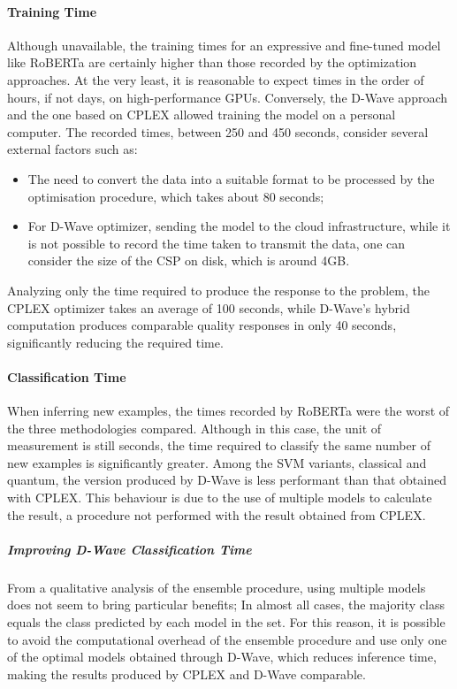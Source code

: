 \paragraph{Training Time} Although unavailable, the training times for an expressive and fine-tuned model like RoBERTa are certainly higher than those recorded by the optimization approaches. 
At the very least, it is reasonable to expect times in the order of hours, if not days, on high-performance GPUs. 
Conversely, the D-Wave approach and the one based on CPLEX allowed training the model on a personal computer. 
The recorded times, between 250 and 450 seconds, consider several external factors such as:
\begin{itemize}
    \item The need to convert the data into a suitable format to be processed by the optimisation procedure, which takes about 80 seconds;
    \item For D-Wave optimizer, sending the model to the cloud infrastructure, while it is not possible to record the time taken to transmit the data, one can consider the size of the CSP on disk, which is around 4GB.  
\end{itemize} 
Analyzing only the time required to produce the response to the problem, the CPLEX optimizer takes an average of 100 seconds, while D-Wave's hybrid computation produces comparable quality responses in only 40 seconds, significantly reducing the required time.

\paragraph{Classification Time} When inferring new examples, the times recor\-ded by RoBERTa were the worst of the three methodologies compared. 
Although in this case, the unit of measurement is still seconds, the time required to classify the same number of new examples is significantly greater. 
Among the SVM variants, classical and quantum, the version produced by D-Wave is less performant than that obtained with CPLEX. 
This behaviour is due to the use of multiple models to calculate the result, a procedure not performed with the result obtained from CPLEX. 

\subparagraph{Improving D-Wave Classification Time} From a qualitative analysis of the ensemble procedure, using multiple models does not seem to bring particular benefits; In almost all cases, the majority class equals the class predicted by each model in the set. 
For this reason, it is possible to avoid the computational overhead of the ensemble procedure and use only one of the optimal models obtained through D-Wave, which reduces inference time, making the results produced by CPLEX and D-Wave comparable.

